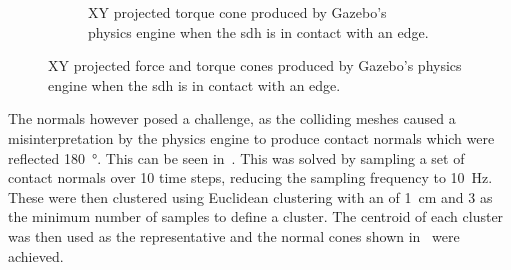 \begin{figure}[!h]
\begin{subfigure}[b]{0.48\textwidth}
		\caption{XY projected torque cone produced by Gazebo's physics engine when the \gls{sdh} is in contact with an edge.}
		\label{fig:xy-projected-torque-cones}
	\end{subfigure}
		\caption{XY projected force and torque cones produced by Gazebo's physics engine when the \gls{sdh} is in contact with an edge.}
		\label{fig:xy-projected-force-torque-cones}
\end{figure}

The normals however posed a challenge, as the colliding meshes caused a misinterpretation by the physics engine to produce contact normals which were reflected \SI{180}{\degree}. This can be seen in~. This was solved by sampling a set of contact normals over \num{10} time steps, reducing the sampling frequency to \SI{10}{\hertz}. These were then clustered using Euclidean clustering with an \mvar{\epsilon} of \SI{1}{\centi\meter} and \num{3} as the minimum number of samples to define a cluster. The centroid of each cluster was then used as the representative and the normal cones shown in~ were achieved.

